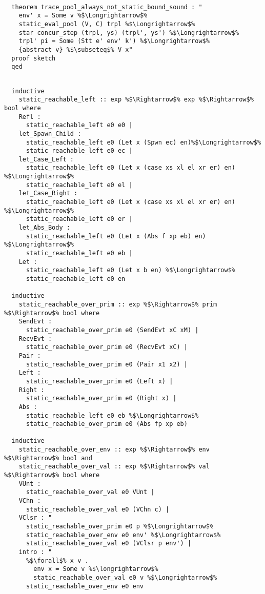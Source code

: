 \documentclass{article}
\begin{document}
\begin{lstlisting}[style=codestyle1, escapechar=\%]

  theorem trace_pool_always_not_static_bound_sound : "
    env' x = Some v %$\Longrightarrow$%
    static_eval_pool (V, C) trpl %$\Longrightarrow$% 
    star concur_step (trpl, ys) (trpl', ys') %$\Longrightarrow$%
    trpl' pi = Some (Stt e' env' k') %$\Longrightarrow$%
    {abstract v} %$\subseteq$% V x"
  proof sketch
  qed

  \end{lstlisting}


\begin{lstlisting}[style=codestyle1, escapechar=\%]

  inductive
    static_reachable_left :: exp %$\Rightarrow$% exp %$\Rightarrow$% bool where
    Refl :
      static_reachable_left e0 e0 | 
    let_Spawn_Child :
      static_reachable_left e0 (Let x (Spwn ec) en)%$\Longrightarrow$%
      static_reachable_left e0 ec |
    let_Case_Left :
      static_reachable_left e0 (Let x (case xs xl el xr er) en) %$\Longrightarrow$%
      static_reachable_left e0 el |
    let_Case_Right :
      static_reachable_left e0 (Let x (case xs xl el xr er) en) %$\Longrightarrow$%
      static_reachable_left e0 er |
    let_Abs_Body :
      static_reachable_left e0 (Let x (Abs f xp eb) en) %$\Longrightarrow$%
      static_reachable_left e0 eb | 
    Let :
      static_reachable_left e0 (Let x b en) %$\Longrightarrow$%
      static_reachable_left e0 en

  inductive
    static_reachable_over_prim :: exp %$\Rightarrow$% prim %$\Rightarrow$% bool where
    SendEvt :
      static_reachable_over_prim e0 (SendEvt xC xM) |
    RecvEvt :
      static_reachable_over_prim e0 (RecvEvt xC) |
    Pair :
      static_reachable_over_prim e0 (Pair x1 x2) |
    Left :
      static_reachable_over_prim e0 (Left x) |
    Right :
      static_reachable_over_prim e0 (Right x) |
    Abs :
      static_reachable_left e0 eb %$\Longrightarrow$%
      static_reachable_over_prim e0 (Abs fp xp eb) 

  inductive 
    static_reachable_over_env :: exp %$\Rightarrow$% env %$\Rightarrow$% bool and
    static_reachable_over_val :: exp %$\Rightarrow$% val %$\Rightarrow$% bool where
    VUnt :
      static_reachable_over_val e0 VUnt |
    VChn :
      static_reachable_over_val e0 (VChn c) |
    VClsr : "
      static_reachable_over_prim e0 p %$\Longrightarrow$%
      static_reachable_over_env e0 env' %$\Longrightarrow$%
      static_reachable_over_val e0 (VClsr p env') |
    intro : "
      %$\forall$% x v .
        env x = Some v %$\longrightarrow$%
        static_reachable_over_val e0 v %$\Longrightarrow$%
      static_reachable_over_env e0 env


\end{lstlisting}
\end{document}

